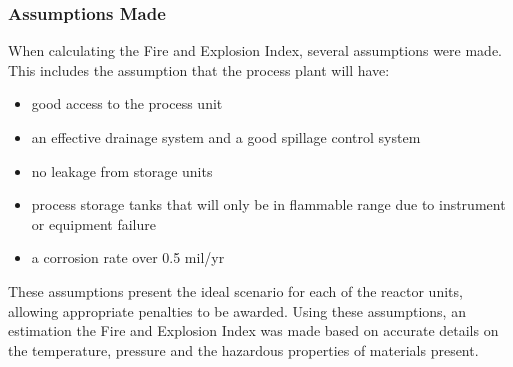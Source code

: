 \subsubsection{Assumptions Made }

When calculating the Fire and Explosion Index, several assumptions were made. This includes the assumption that the process plant will have:
\begin{itemize}
\item good access to the process unit
\item an effective drainage system and a good spillage control system
\item no leakage from storage units 
\item process storage tanks that will only be in flammable range due to instrument or equipment failure
\item a corrosion rate over 0.5 mil/yr
\end{itemize}

These assumptions present the ideal scenario for each of the reactor units, allowing appropriate penalties to be awarded. Using these assumptions, an estimation the Fire and Explosion Index was made based on accurate details on the temperature, pressure and the hazardous properties of materials present. 

